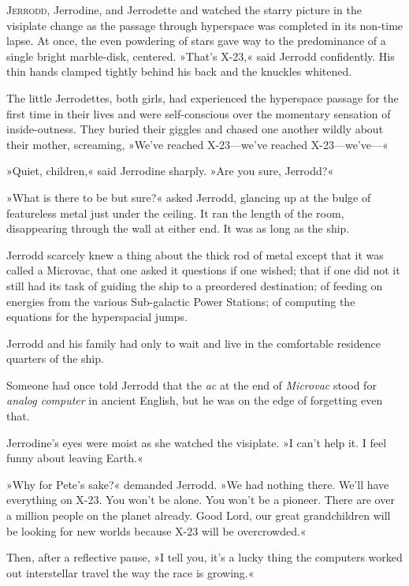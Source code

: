 \documentclass[11pt,twocolumn,paper=a5,pagesize,twoside]{scrartcl}
\newcommand{\q}[1]{»#1«}
\newcommand{\futureone}[1]{ #1 }
\newcommand{\specialinitialb}[1]{
\lettrine[lines=3,lhang=0.21,nindent=0em]{  
\fontspec{Final Frontier}\fontsize{48}{48}\selectfont #1}}
\newcommand{\initialb}[1]{ \lettrine[lines=3,lhang=0.3,nindent=1em]{  {\textsf{#1}}}{}}
\begin{document}
\futureone{
\specialinitialb{J}{errodd}, Jerrodine, and Jerrodette \MakeUppercase{\romannumeral 1}
and \MakeUppercase{\romannumeral 2} watched the starry picture in the 
visiplate change as the passage through hyperspace was completed in its 
non-time lapse. At once, the even powdering of stars gave way to the 
predominance of a single bright marble-disk, centered.
\q{That's X-23,} said Jerrodd confidently. His thin hands clamped tightly 
behind his back and the knuckles whitened.

The little Jerrodettes, both girls, had experienced the hyperspace passage 
for the first time in their lives and were self-conscious over the momentary 
sensation of inside-outness. They buried their giggles and chased one another 
wildly about their mother, screaming, \q{We've reached X-23---we've reached 
X-23---we've---}

\q{Quiet, children,} said Jerrodine sharply. \q{Are you sure, Jerrodd?}

\q{What is there to be but sure?} asked Jerrodd, glancing up at the bulge 
of featureless metal just under the ceiling. It ran the length of the room, 
disappearing through the wall at either end. It was as long as the ship.

Jerrodd scarcely knew a thing about the thick rod of metal except that it 
was called a Microvac, that one asked it questions if one wished; that if 
one did not it still had its task of guiding the ship to a preordered 
destination; of feeding on energies from the various Sub-galactic Power 
Stations; of computing the equations for the hyperspacial jumps.

Jerrodd and his family had only to wait and live in the comfortable residence 
quarters of the ship.

Someone had once told Jerrodd that the \textit{ac} at the end of 
\textit{Microvac} stood for \textit{analog computer} in ancient English, but 
he was on the edge of forgetting even that.

Jerrodine's eyes were moist as she watched the visiplate. \q{I can't help it. 
I feel funny about leaving Earth.}

\q{Why for Pete's sake?} demanded Jerrodd. \q{We had nothing there. We'll 
have everything on X-23. You won't be alone. You won't be a pioneer. There 
are over a million people on the planet already. Good Lord, our great 
grandchildren will be looking for new worlds because X-23 will be overcrowded.}

Then, after a reflective pause, \q{I tell you, it's a lucky thing the 
computers worked out interstellar travel the way the race is growing.}

}
\end{document}
